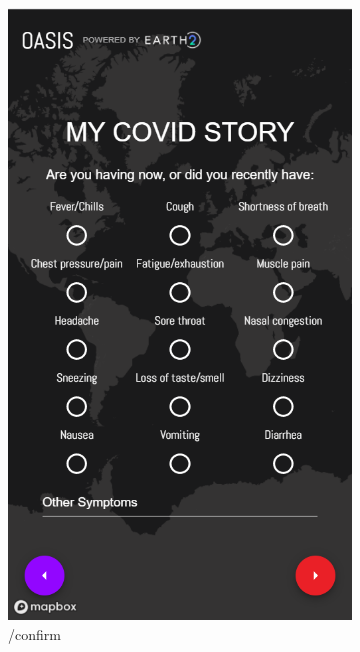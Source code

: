 \documentclass{ucsdreport}
\begin{document}
\begin{figure}[H]
\begin{subfigure}{.33\textwidth}
		\includegraphics[scale = 0.47]{images/update5.PNG}
		\caption{/confirm}
	\end{subfigure}
	\begin{subfigure}{.33\textwidth}
	    \centering

\end{subfigure}
\end{figure}
\end{document}
